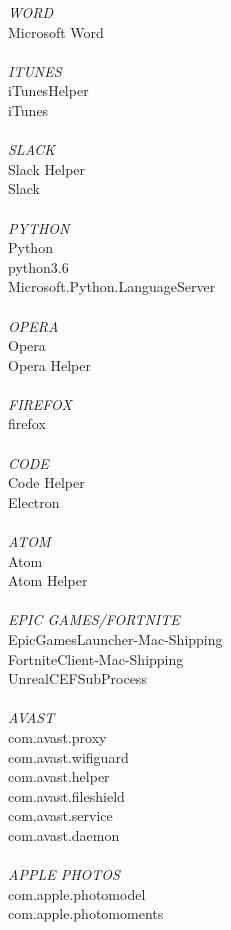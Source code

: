\textit{WORD}\\
Microsoft Word\\
\\
\textit{ITUNES}\\
iTunesHelper\\
iTunes\\
\\
\textit{SLACK}\\
Slack Helper\\
Slack\\
\\
\textit{PYTHON}\\
Python\\
python3.6\\
Microsoft.Python.LanguageServer\\
\\
\textit{OPERA}\\
Opera\\
Opera Helper\\
\\
\textit{FIREFOX}\\
firefox\\
\\
\textit{CODE}\\
Code Helper\\
Electron\\
\\
\textit{ATOM}\\
Atom\\
Atom Helper\\
\\
\textit{EPIC GAMES/FORTNITE}\\
EpicGamesLauncher-Mac-Shipping\\
FortniteClient-Mac-Shipping\\
UnrealCEFSubProcess\\
\\
\textit{AVAST}\\
com.avast.proxy\\
com.avast.wifiguard\\
com.avast.helper\\
com.avast.fileshield\\
com.avast.service\\
com.avast.daemon\\
\\
\textit{APPLE PHOTOS}\\
com.apple.photomodel\\
com.apple.photomoments\\
\\
